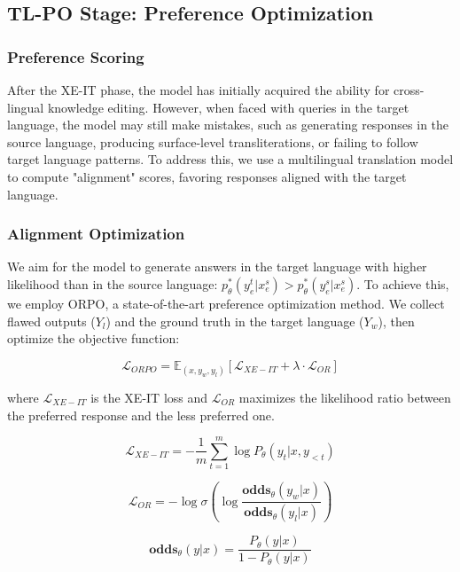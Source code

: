 \subsection{TL-PO Stage: Preference Optimization}

\subsubsection{Preference Scoring}

After the XE-IT phase, the model has initially acquired the ability for cross-lingual knowledge editing. However, when faced with queries in the target language, the model may still make mistakes, such as generating responses in the source language, producing surface-level transliterations, or failing to follow target language patterns. To address this, we use a multilingual translation model to compute "alignment" scores, favoring responses aligned with the target language.

\subsubsection{Alignment Optimization}

We aim for the model to generate answers in the target language with higher likelihood than in the source language: 
$p_{\theta}^*(y_e^t|x_e^s) > p_{\theta}^*(y_e^s|x_e^s)$. To achieve this, we employ ORPO, a state-of-the-art preference optimization method. We collect flawed outputs ($Y_l$) and the ground truth in the target language ($Y_w$), then optimize the objective function:

\begin{equation}
    \mathcal{L}_{ORPO} = \mathbb{E}_{(x, y_w, y_l)}\left[ \mathcal{L}_{XE-IT} + \lambda \cdot \mathcal{L}_{OR} \right]
    \label{eq:main}
\end{equation}

where $\mathcal{L}_{XE-IT}$ is the XE-IT loss and $\mathcal{L}_{OR}$ maximizes the likelihood ratio between the preferred response and the less preferred one.

\begin{equation}
    \mathcal{L}_{XE-IT} = - \frac{1}{m} \sum_{t=1}^{m} \log P_\theta(y_t | x, y_{<t}) \label{eq:xe-it}
\end{equation}

\begin{equation}
    \mathcal{L}_{OR} = -\log \sigma \left( \log \frac{\textbf{odds}_\theta(y_w|x)}{\textbf{odds}_\theta(y_l|x)} \right) \label{eq:ratio} 
\end{equation}

\begin{equation}
    \textbf{odds}_\theta(y|x) = \frac{P_\theta(y|x)}{1 - P_\theta(y|x)}\label{eq:odds}
\end{equation}